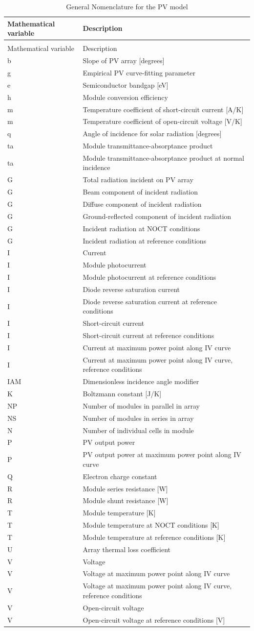 \begin{longtable}[c]{p{1.5in}p{4.5in}}
\caption{General Nomenclature for the PV model \label{table:general-nomenclature-for-the-pv-model}} \tabularnewline
\toprule 
Mathematical variable & Description \tabularnewline
\midrule
\endfirsthead

\caption[]{General Nomenclature for the PV model} \tabularnewline
\toprule 
Mathematical variable & Description \tabularnewline
\midrule
\endhead

b & Slope of PV array [degrees] \tabularnewline
g & Empirical PV curve-fitting parameter \tabularnewline
e & Semiconductor bandgap [eV] \tabularnewline
h & Module conversion efficiency \tabularnewline
m & Temperature coefficient of short-circuit current [A/K] \tabularnewline
m & Temperature coefficient of open-circuit voltage [V/K] \tabularnewline
q & Angle of incidence for solar radiation [degrees] \tabularnewline
ta & Module transmittance-absorptance product \tabularnewline
ta & Module transmittance-absorptance product at normal incidence \tabularnewline
G & Total radiation incident on PV array \tabularnewline
G & Beam component of incident radiation \tabularnewline
G & Diffuse component of incident radiation \tabularnewline
G & Ground-reflected component of incident radiation \tabularnewline
G & Incident radiation at NOCT conditions \tabularnewline
G & Incident radiation at reference conditions \tabularnewline
I & Current \tabularnewline
I & Module photocurrent \tabularnewline
I & Module photocurrent at reference conditions \tabularnewline
I & Diode reverse saturation current \tabularnewline
I & Diode reverse saturation current at reference conditions \tabularnewline
I & Short-circuit current \tabularnewline
I & Short-circuit current at reference conditions \tabularnewline
I & Current at maximum power point along IV curve \tabularnewline
I & Current at maximum power point along IV curve, reference conditions \tabularnewline
IAM & Dimensionless incidence angle modifier \tabularnewline
K & Boltzmann constant [J/K] \tabularnewline
NP & Number of modules in parallel in array \tabularnewline
NS & Number of modules in series in array \tabularnewline
N & Number of individual cells in module \tabularnewline
P & PV output power \tabularnewline
P & PV output power at maximum power point along IV curve \tabularnewline
Q & Electron charge constant \tabularnewline
R & Module series resistance [W] \tabularnewline
R & Module shunt resistance [W] \tabularnewline
T­ & Module temperature [K] \tabularnewline
T & Module temperature at NOCT conditions [K] \tabularnewline
T & Module temperature at reference conditions [K] \tabularnewline
U & Array thermal loss coefficient \tabularnewline
V & Voltage \tabularnewline
V & Voltage at maximum power point along IV curve \tabularnewline
V & Voltage at maximum power point along IV curve, reference conditions \tabularnewline
V­ & Open-circuit voltage \tabularnewline
V & Open-circuit voltage at reference conditions [V] \tabularnewline
\bottomrule
\end{longtable}

